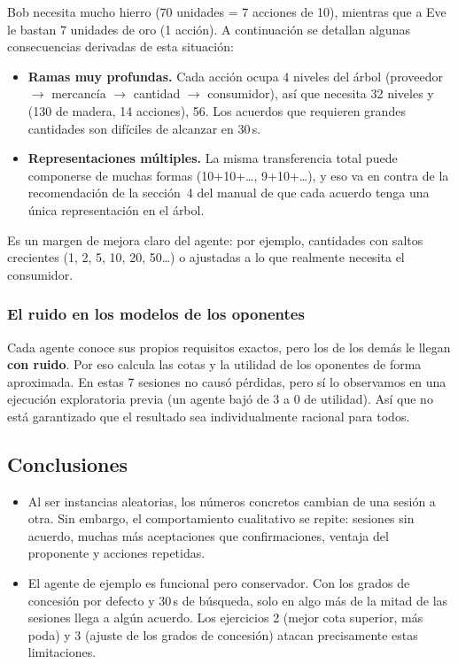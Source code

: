Bob necesita mucho hierro (70 unidades = 7 acciones de 10), mientras que a Eve le bastan 7 unidades
de oro (1 acción). A continuación se detallan algunas consecuencias derivadas de esta situación:

\begin{itemize}
  \item \textbf{Ramas muy profundas.} Cada acción ocupa 4 niveles del árbol (proveedor
        $\rightarrow$ mercancía $\rightarrow$ cantidad $\rightarrow$ consumidor), así que 
        necesita 32 niveles y  (130 de madera, 14 acciones), 56. Los acuerdos que
        requieren grandes cantidades son difíciles de alcanzar en 30\,s.
  \item \textbf{Representaciones múltiples.} La misma transferencia total puede componerse de muchas
        formas (10+10+\ldots, 9+10+\ldots), y eso va en contra de la recomendación de la sección~4
        del manual de que cada acuerdo tenga una única representación en el árbol.
\end{itemize}

Es un margen de mejora claro del agente: por ejemplo, cantidades con saltos crecientes (1, 2, 5, 10,
20, 50\ldots) o ajustadas a lo que realmente necesita el consumidor.

\subsubsection{El ruido en los modelos de los oponentes}
\label{sec:ej1-ruido}

Cada agente conoce sus propios requisitos exactos, pero los de los demás le llegan \textbf{con
ruido}. Por eso calcula las cotas y la utilidad de los oponentes de forma aproximada. En estas 7
sesiones no causó pérdidas, pero sí lo observamos en una ejecución exploratoria previa (un agente
bajó de 3 a 0 de utilidad). Así que no está garantizado que el resultado sea individualmente
racional para todos.

\subsection{Conclusiones}
\label{sec:ej1-conclusiones}

\begin{itemize}
  \item Al ser instancias aleatorias, los números concretos cambian de una sesión a otra. Sin
        embargo, el comportamiento cualitativo se repite: sesiones sin acuerdo, muchas más
        aceptaciones que confirmaciones, ventaja del proponente y acciones repetidas.
  \item El agente de ejemplo es funcional pero conservador. Con los grados de concesión por defecto
        y 30\,s de búsqueda, solo en algo más de la mitad de las sesiones llega a algún acuerdo. Los
        ejercicios 2 (mejor cota superior, más poda) y 3 (ajuste de los grados de concesión) atacan
        precisamente estas limitaciones.
\end{itemize}
